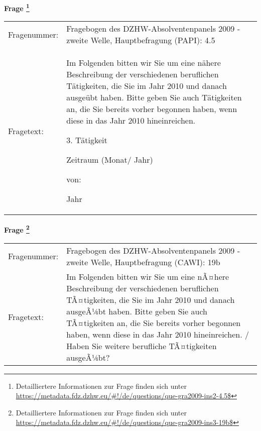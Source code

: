 				\vspace*{0.5cm}
                \noindent\textbf{Frage
	                \footnote{Detailliertere Informationen zur Frage finden sich unter
		              \url{https://metadata.fdz.dzhw.eu/\#!/de/questions/que-gra2009-ins2-4.5$}}}\\
				\begin{tabularx}{\hsize}{@{}lX}
					Fragenummer: &
					  Fragebogen des DZHW-Absolventenpanels 2009 - zweite Welle, Hauptbefragung (PAPI):
					  4.5
 \\
					Fragetext: & Im Folgenden bitten wir Sie um eine nähere Beschreibung der verschiedenen beruflichen Tätigkeiten, die Sie im Jahr 2010 und danach ausgeübt haben. Bitte geben Sie auch Tätigkeiten an, die Sie bereits vorher begonnen haben, wenn diese in das Jahr 2010 hineinreichen.\par  3. Tätigkeit\par  Zeitraum (Monat/ Jahr)\par  von:\par  Jahr \\
				\end{tabularx}
				\vspace*{0.5cm}
                \noindent\textbf{Frage
	                \footnote{Detailliertere Informationen zur Frage finden sich unter
		              \url{https://metadata.fdz.dzhw.eu/\#!/de/questions/que-gra2009-ins3-19b$}}}\\
				\begin{tabularx}{\hsize}{@{}lX}
					Fragenummer: &
					  Fragebogen des DZHW-Absolventenpanels 2009 - zweite Welle, Hauptbefragung (CAWI):
					  19b
 \\
					Fragetext: & Im Folgenden bitten wir Sie um eine nÃ¤here Beschreibung der verschiedenen beruflichen TÃ¤tigkeiten, die Sie im Jahr 2010 und danach ausgeÃ¼bt haben. Bitte geben Sie auch TÃ¤tigkeiten an, die Sie bereits vorher begonnen haben, wenn diese in das Jahr 2010 hineinreichen. / Haben Sie weitere berufliche TÃ¤tigkeiten ausgeÃ¼bt? \\
				\end{tabularx}





